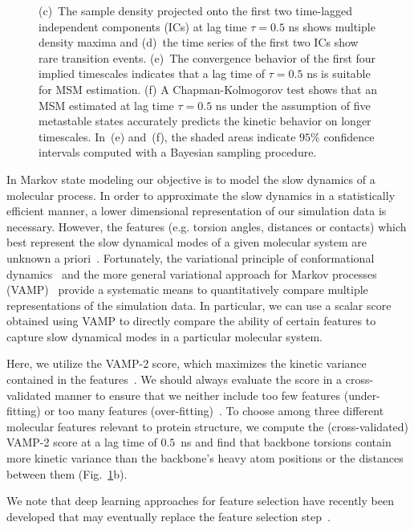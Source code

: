 \documentclass[9pt,tutorial]{livecoms}
\begin{document}
\begin{figure}
{(c)~The sample density projected onto the first two time-lagged independent components (ICs) at lag time $\tau=0.5$ ns shows multiple density maxima and
(d)~the time series of the first two ICs show rare transition events.
(e)~The convergence behavior of the first four implied timescales indicates that a lag time of $\tau=0.5$ ns is suitable for MSM estimation.
(f) A Chapman-Kolmogorov test shows that an MSM estimated at lag time $\tau=0.5$ ns under the assumption of five metastable states accurately predicts the kinetic behavior on longer timescales.
In~(e) and~(f), the shaded areas indicate $95\%$ confidence intervals computed with a Bayesian sampling procedure.}
\label{fig:io-to-ck}
\end{figure}

In Markov state modeling our objective is to model the slow dynamics of a molecular process. In order to approximate the slow dynamics in a statistically efficient manner, a lower dimensional representation of our simulation data is necessary.
However, the features (e.g. torsion angles, distances or contacts) which best represent the slow dynamical modes of a given molecular system are unknown a priori~\cite{NoeClementiReview}.
Fortunately, the variational principle of conformational dynamics~\cite{noe-vac,nueske-vamk} and the more general variational approach for Markov processes (VAMP)~\cite{vamp-preprint} provide a systematic means to quantitatively compare multiple representations of the simulation data.
In particular, we can use a scalar score obtained using VAMP to directly compare the ability of certain features to capture slow dynamical modes in a particular molecular system.

Here, we utilize the VAMP-2 score, which maximizes the kinetic variance contained in the features~\cite{kinetic-maps}.
We should always evaluate the score in a cross-validated manner to ensure that we neither include too few features (under-fitting) or too many features (over-fitting)~\cite{gmrq,vamp-preprint}.
To choose among three different molecular features relevant to protein structure, we compute the (cross-validated) VAMP-2 score at a lag time of $0.5$~ns and find that backbone torsions contain more kinetic variance than the backbone's heavy atom positions or the distances between them (Fig.~\ref{fig:io-to-ck}b).

We note that deep learning approaches for feature selection have recently been developed that may eventually replace the feature selection step~\cite{vampnet,tae,hernandez-vde}.
\end{document}
